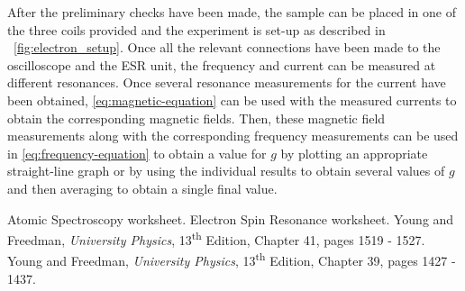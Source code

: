 \documentclass{article}
\newcommand{\figref}[2][\figurename~]{#1\ref{#2}}
\begin{document}
\vspace{2mm}
\noindent
After the preliminary checks have been made, the sample can be placed in one of the three coils provided and the experiment is set-up as described in \figref{fig:electron_setup}. Once all the relevant connections have been made to the oscilloscope and the ESR unit, the frequency and current can be measured at different resonances. Once several resonance measurements for the current have been obtained, \eqref{eq:magnetic-equation} can be used with the measured currents to obtain the corresponding magnetic fields. Then, these magnetic field measurements along with the corresponding frequency measurements can be used in \eqref{eq:frequency-equation} to obtain a value for $g$ by plotting an appropriate straight-line graph or by using the individual results to obtain several values of $g$ and then averaging to obtain a single final value.














\begin{thebibliography}{9}
 Atomic Spectroscopy worksheet.
 Electron Spin Resonance worksheet. 
 Young and Freedman, \textit{University Physics}, 13\textsuperscript{th} Edition, Chapter 41, pages 1519 - 1527.
 Young and Freedman, \textit{University Physics}, 13\textsuperscript{th} Edition, Chapter 39, pages 1427 - 1437.
\end{thebibliography}
\end{document}
